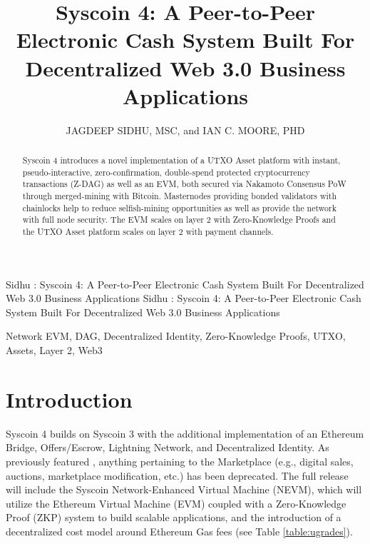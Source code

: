 \documentclass[peerreview]{ieeesyscoin}
\begin{document}
\history{}

\title{\centering Syscoin 4: A Peer-to-Peer Electronic Cash System Built For Decentralized
Web 3.0 Business Applications}
\author{\centering  \uppercase{Jagdeep Sidhu, MSc}, 
and \uppercase{Ian C. Moore, PhD}}

\address[1]{\centering Syscoin Core Developer, Blockchain Foundry Inc.(e-mail: jsidhu@blockchainfoundry.co)}
\address[2]{\centering  (Syscoin Researcher, e-mail: imoore@syscoin.org)}
\tfootnote{}

\markboth
{Sidhu \headeretal: Syscoin 4: A Peer-to-Peer Electronic Cash System Built For Decentralized
Web 3.0 Business Applications}
{Sidhu \headeretal: Syscoin 4: A Peer-to-Peer Electronic Cash System Built For Decentralized Web 3.0 Business Applications}

\corresp{}

\begin{abstract}
Syscoin 4 introduces a novel implementation of a UTXO Asset platform with instant, pseudo-interactive, zero-confirmation, double-spend protected cryptocurrency transactions (Z-DAG) as well as an EVM, both secured via Nakamoto Consensus PoW through merged-mining with Bitcoin. Masternodes providing bonded validators with chainlocks help to reduce selfish-mining opportunities as well as provide the network with full node security. The EVM scales on layer 2 with Zero-Knowledge Proofs and the UTXO Asset platform scales on layer 2 with payment channels.
\end{abstract}

\begin{keywords}
Network EVM, DAG, Decentralized Identity, Zero-Knowledge Proofs, UTXO, Assets, Layer 2, Web3
\end{keywords}

\titlepgskip=-15pt

\maketitle

\section{Introduction}
\label{sec:introduction}

Syscoin 4 builds on Syscoin 3 with the additional implementation of an Ethereum Bridge, Offers/Escrow, Lightning Network, and Decentralized Identity. As previously featured \cite{Sida18}, anything pertaining to the Marketplace (e.g., digital sales, auctions, marketplace modification, etc.) has been deprecated. The full release will include the Syscoin Network-Enhanced Virtual Machine (NEVM), which will utilize the Ethereum Virtual Machine (EVM) coupled with a Zero-Knowledge Proof (ZKP) system to build scalable applications, and the introduction of a decentralized cost model around Ethereum Gas fees (see Table \ref{table:ugrades}).
\end{document}
